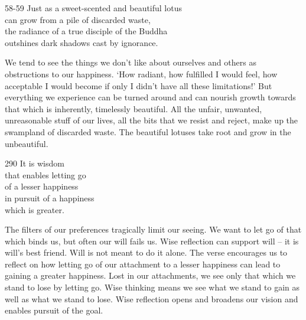 
\begin{dhpVerse}{58-59}
\label{dhp-58}\label{dhp-59}
Just as a sweet-scented and beautiful lotus\\
can grow from a pile of discarded waste,\\
the radiance of a true disciple of the Buddha\\
outshines dark shadows cast by ignorance.
\end{dhpVerse}

\begin{dhpRefl}

We tend to see the things we don't like about ourselves and others as
obstructions to our happiness. `How radiant, how fulfilled I would
feel, how acceptable I would become if only I didn't have all these
limitations!' But everything we experience can be turned around and
can nourish growth towards that which is inherently, timelessly
beautiful. All the unfair, unwanted, unreasonable stuff of our lives,
all the bits that we resist and reject, make up the swampland of
discarded waste. The beautiful lotuses take root and grow in the
unbeautiful.

\end{dhpRefl}


\begin{dhpVerse}{290}
\label{dhp-290}
It is wisdom\\
that enables letting go\\
of a lesser happiness\\
in pursuit of a happiness\\
which is greater.
\end{dhpVerse}

\begin{dhpRefl}

The filters of our preferences tragically limit our seeing. We want
to let go of that which binds us, but often our will fails us. Wise
reflection can support will -- it is will's best friend. Will is not
meant to do it alone. The verse encourages us to reflect on how
letting go of our attachment to a lesser happiness can lead to
gaining a greater happiness. Lost in our attachments, we see only
that which we stand to lose by letting go. Wise thinking means we see
what we stand to gain as well as what we stand to lose.
Wise reflection opens and broadens our vision and enables pursuit of the
goal.

\end{dhpRefl}

